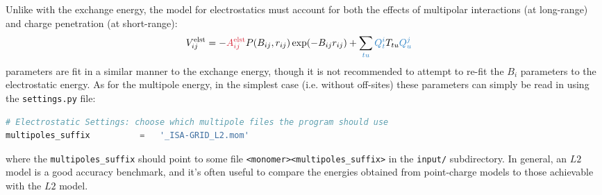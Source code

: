 Unlike with the exchange energy, the model for electrostatics must account for
both the effects of multipolar interactions (at long-range) and charge
penetration (at short-range):
%
\begin{align}
\velst_{ij} &= -\textcolor{fit}{\Ael{ij}} P(\B, r_{ij}) \exp(-\B r_{ij}) + \vmultipolecolor
\end{align}
%
 parameters are fit in a similar manner to the exchange energy, though
it is not recommended to attempt to re-fit the $B_i$ parameters to the
electrostatic energy. As for the multipole energy, in the simplest case (i.e.
without off-sites) these
parameters can simply be read in using the \verb|settings.py| file:
%
\begin{lstlisting}[language=python]
# Electrostatic Settings: choose which multipole files the program should use
multipoles_suffix          =   '_ISA-GRID_L2.mom'
\end{lstlisting}
%
where the \verb|multipoles_suffix| should point to some file
\verb|<monomer><multipoles_suffix>| in the \verb|input/| subdirectory.
In general, an $L2$ model is a good accuracy benchmark, and it's often useful
to compare the energies obtained from point-charge
models to those achievable with the $L2$ model.


